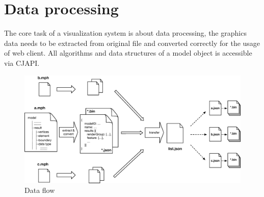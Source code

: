 \section{Data processing}

 The core task of a visualization system is about data processing, the graphics data needs to be extracted from original file and converted correctly for the usage of web client. All algorithms and data structures of a model object is accessible via CJAPI. 
 
 \begin{figure}[htb]
  \centering
  \includegraphics[width=.9\textwidth]{Assets/Data_convert}
  \caption{Data flow}
\end{figure}